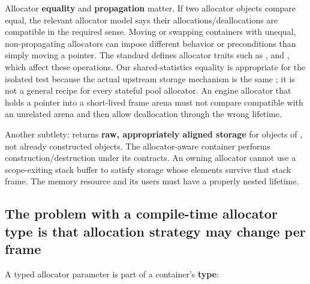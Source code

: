 Allocator \textbf{equality} and \textbf{propagation} matter. If two allocator objects compare equal, the relevant allocator model says their allocations/deallocations are compatible in the required sense. Moving or swapping containers with unequal, non-propagating allocators can impose different behavior or preconditions than simply moving a pointer. The standard defines allocator traits such as ,  and , which affect these operations. Our shared-statistics equality is appropriate for the isolated test because the actual upstream storage mechanism is the same ; it is not a general recipe for every stateful pool allocator. An engine allocator that holds a pointer into a short-lived frame arena must not compare compatible with an unrelated arena and then allow deallocation through the wrong lifetime.

Another subtlety:  returns \textbf{raw, appropriately aligned storage} for  objects of , not  already constructed objects. The allocator-aware container performs construction/destruction under its contracts. An owning allocator cannot use a scope-exiting stack buffer to satisfy storage whose elements survive that stack frame. The memory resource and its users must have a properly nested lifetime.

\subsection{The problem with a compile-time allocator type is that allocation strategy may change per frame}\label{05-engine-i-ch006-the-problem-with-a-compile-time-allocator-type-is-that-allocation-strategy-may-change-per-frame}

\hypertarget{05-engine-i-ch006-the-problem-with-a-compile-time-allocator-type-is-that-allocation-strategy-may-change-per-frame}{}

A typed allocator parameter is part of a container's \textbf{type}:

